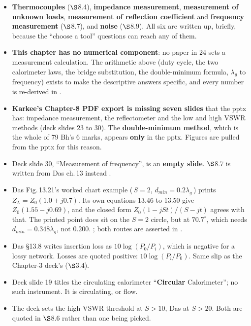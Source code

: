 \begin{itemize}
  \item \textbf{Thermocouples} ($\S$8.4), \textbf{impedance measurement}, \textbf{measurement
    of unknown loads}, \textbf{measurement of reflection coefficient} and \textbf{frequency
    measurement} ($\S$8.7), and \textbf{noise} ($\S$8.9). All six are written up, briefly,
    because the ``choose a tool'' questions can reach any of them.
\end{itemize}

\begin{itemize}
  \item \textbf{This chapter has no numerical component}: no paper in 24 sets a measurement
    calculation. The arithmetic above (duty cycle, the two calorimeter laws, the bridge
    substitution, the double-minimum formula, $\lambda_g$ to frequency) exists to make the
    descriptive answers specific, and every number is re-derived in .
\end{itemize}

\begin{itemize}
  \item \textbf{Karkee's Chapter-8 PDF export is missing seven slides} that the pptx has:
    impedance measurement, the reflectometer and the low and high VSWR methods (deck slides
    23 to 30). The \textbf{double-minimum method}, which is the whole of 79 Bh's 6 marks,
    appears \textbf{only} in the pptx. Figures are pulled from the pptx for this reason.
  \item Deck slide 30, ``Measurement of frequency'', is an \textbf{empty slide}. $\S$8.7 is
    written from Das ch.\,13 instead \added{}.
  \item Das Fig.\,13.21's worked chart example (\,$S = 2$, $d_{min} = 0.2\lambda_g$\,) prints
    $Z_L = Z_0(1.0 + j0.7)$. Its own equations 13.46 to 13.50 give
    $Z_0(1.55 - j0.69)$, and the closed form $Z_0(1-jSt)/(S-jt)$ agrees with that. The
    printed point does sit on the $S = 2$ circle, but at $70.7^\circ$, which needs
    $d_{min} = 0.348\lambda_g$, not $0.200$. ; both routes are asserted in .
  \item Das \S13.8 writes insertion loss as $10\log(P_0/P_i)$, which is negative for a lossy
    network. Losses are quoted positive: $10\log(P_i/P_0)$. Same slip as the Chapter-3 deck's
    ($\S$3.4).
  \item Deck slide 19 titles the circulating calorimeter ``\textbf{Circular} Calorimeter'';
    no such instrument. It is circulating, or flow.
  \item The deck sets the high-VSWR threshold at $S > 10$, Das at $S > 20$. Both are quoted
    in $\S$8.6 rather than one being picked.
\end{itemize}
